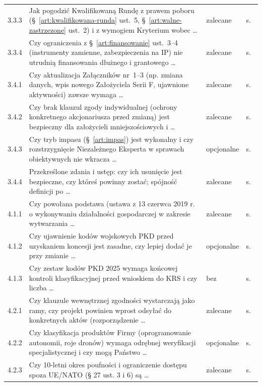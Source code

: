 \documentclass[12pt,a4paper]{report}
\begin{document}
{\begin{longtable}{@{}p{1.2cm} p{9.6cm} p{2.3cm} p{1.4cm}@{}}
3.3.3 & Jak pogodzić Kwalifikowaną Rundę z prawem poboru (§~\ref{art:kwalifikowana-runda} ust.~5, §~\ref{art:walne-zastrzezone} ust.~2) i z wymogiem Kryterium wobec \ldots & zalecane & s.~\pageref{memo:3.3.3} \\
3.3.4 & Czy ograniczenia z §~\ref{art:finansowanie} ust.~3--4 (instrumenty zamienne, zabezpieczenia na IP) nie utrudnią finansowania dłużnego i grantowego \ldots & zalecane & s.~\pageref{memo:3.3.4} \\
3.4.1 & Czy aktualizacja Załączników nr~1--3 (np. zmiana danych, wpis nowego Założyciela Serii F, ujawnione aktywności) zawsze wymaga \ldots & zalecane & s.~\pageref{memo:3.4.1} \\
3.4.2 & Czy brak klauzul zgody indywidualnej (ochrony konkretnego akcjonariusza przed zmianą) jest bezpieczny dla założycieli mniejszościowych i \ldots & zalecane & s.~\pageref{memo:3.4.2} \\
3.4.3 & Czy tryb impasu (§~\ref{art:impas}) jest wykonalny i czy rozstrzygnięcie Niezależnego Eksperta w sprawach obiektywnych nie wkracza \ldots & opcjonalne & s.~\pageref{memo:3.4.3} \\
3.4.4 & Przekreślone zdania i ustęp: czy ich usunięcie jest bezpieczne, czy któreś powinny zostać; spójność definicji po \ldots & zalecane & s.~\pageref{memo:3.4.4} \\
4.1.1 & Czy powołana podstawa (ustawa z 13 czerwca 2019 r. o wykonywaniu działalności gospodarczej w zakresie wytwarzania \ldots & zalecane & s.~\pageref{memo:4.1.1} \\
4.1.2 & Czy ujawnienie kodów wojskowych PKD przed uzyskaniem koncesji jest zasadne, czy lepiej dodać je przy zmianie \ldots & opcjonalne & s.~\pageref{memo:4.1.2} \\
4.1.3 & Czy zestaw kodów PKD 2025 wymaga końcowej kontroli klasyfikacyjnej przed wnioskiem do KRS i czy liczba \ldots & bez & s.~\pageref{memo:4.1.3} \\
4.2.1 & Czy klauzule wewnętrznej zgodności wystarczają jako ramy, czy projekt powinien wprost odsyłać do konkretnych aktów (rozporządzenie \ldots & zalecane & s.~\pageref{memo:4.2.1} \\
4.2.2 & Czy klasyfikacja produktów Firmy (oprogramowanie autonomii, roje dronów) wymaga odrębnej weryfikacji specjalistycznej i czy mogą Państwo \ldots & opcjonalne & s.~\pageref{memo:4.2.2} \\
4.2.3 & Czy 10-letni okres poufności i ograniczenie dostępu spoza UE/NATO (§ 27 ust. 3 i 6) są \ldots & zalecane & s.~\pageref{memo:4.2.3} \\

\end{longtable}}
\end{document}
